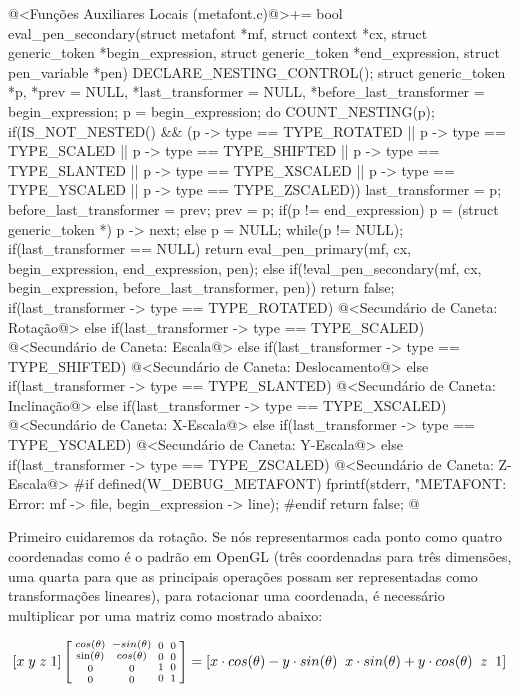 {\iniciocodigo
@<Funções Auxiliares Locais (metafont.c)@>+=
bool eval_pen_secondary(struct metafont *mf, struct context *cx,
                        struct generic_token *begin_expression,
                        struct generic_token *end_expression,
                        struct pen_variable *pen){
  DECLARE_NESTING_CONTROL();
  struct generic_token *p, *prev = NULL, *last_transformer = NULL,
                       *before_last_transformer = begin_expression;
  p = begin_expression;
  do{
    COUNT_NESTING(p);
    if(IS_NOT_NESTED() && (p -> type == TYPE_ROTATED ||
       p -> type == TYPE_SCALED || p -> type == TYPE_SHIFTED ||
       p -> type == TYPE_SLANTED || p -> type == TYPE_XSCALED ||
       p -> type == TYPE_YSCALED || p -> type == TYPE_ZSCALED)){
      last_transformer = p;
      before_last_transformer = prev;
    }
    prev = p;
    if(p != end_expression)
      p = (struct generic_token *) p -> next;
    else
      p = NULL;
  }while(p != NULL);
  if(last_transformer == NULL)
    return eval_pen_primary(mf, cx, begin_expression, end_expression, pen);
  else{
    if(!eval_pen_secondary(mf, cx, begin_expression, before_last_transformer, pen))
      return false;
    if(last_transformer -> type == TYPE_ROTATED){
      @<Secundário de Caneta: Rotação@>
    }
    else if(last_transformer -> type == TYPE_SCALED){
      @<Secundário de Caneta: Escala@>
    }
    else if(last_transformer -> type == TYPE_SHIFTED){
      @<Secundário de Caneta: Deslocamento@>
    }
    else if(last_transformer -> type == TYPE_SLANTED){
      @<Secundário de Caneta: Inclinação@>
    }
    else if(last_transformer -> type == TYPE_XSCALED){
      @<Secundário de Caneta: X-Escala@>
    }
    else if(last_transformer -> type == TYPE_YSCALED){
      @<Secundário de Caneta: Y-Escala@>
    }
    else if(last_transformer -> type == TYPE_ZSCALED){
      @<Secundário de Caneta: Z-Escala@>
    }
#if defined(W_DEBUG_METAFONT)
    fprintf(stderr, "METAFONT: Error: %
            mf -> file, begin_expression -> line);
#endif
    return false;
  }
}
@
\fimcodigo

Primeiro cuidaremos da rotação. Se nós representarmos cada ponto como
quatro coordenadas como é o padrão em OpenGL (três coordenadas para
três dimensões, uma quarta para que as principais operações possam ser
representadas como transformações lineares), para rotacionar uma
coordenada, é necessário multiplicar por uma matriz como mostrado
abaixo:

$$\left[x\; y\; z\; 1\right]\left[{{cos(\theta) \atop \sin(\theta)}\atop
      {0\atop 0}}{{-sin(\theta) \atop cos(\theta)}\atop {0 \atop
      0}}{{0\atop 0}\atop{1 \atop 0}}{{0 \atop 0}\atop{0\atop
      1}}\right]=\left[x\cdot cos(\theta) - y\cdot sin(\theta)\;\;
      x\cdot sin(\theta) + y\cdot cos(\theta)\;\; z\;\; 1\right]
$$

}
